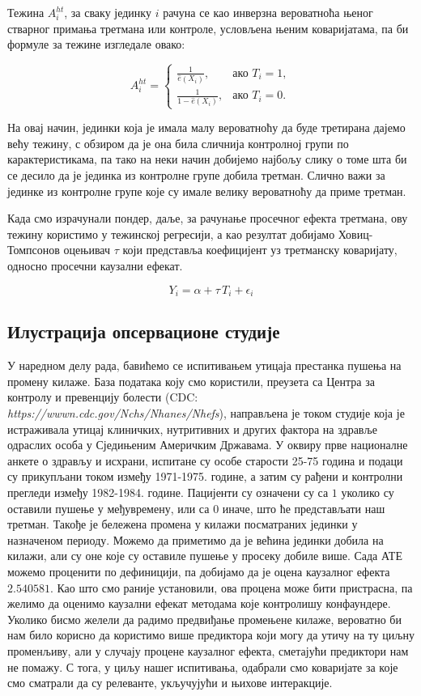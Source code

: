 \documentclass[12pt, a4paper]{article}
\begin{document}
Тежина $A_i^{ht}$, за сваку јединку $i$ рачуна се као инверзна вероватноћа њеног стварног примања третмана или контроле, условљена њеним коваријатама, па би формуле за тежине изгледале овако:

\[
A_i^{ht} =
\begin{cases}
\displaystyle \frac{1}{\hat{e}(X_i)}, & \text{ако } T_i = 1,\\[2mm]
\displaystyle \frac{1}{1 - \hat{e}(X_i)}, & \text{ако } T_i = 0.
\end{cases}
\]


На овај начин, јединки која је имала малу вероватноћу да буде третирана дајемо већу тежину, с обзиром да је она била сличнија контролној групи по карактеристикама, па тако на неки начин добијемо најбољу слику о томе шта би се десило да је јединка из контролне групе добила третман. Слично важи за јединке из контролне групе које су имале велику вероватноћу да приме третман.

Када смо израчунали пондер, даље, за рачунање просечног ефекта третмана, ову тежину користимо у тежинској регресији, а као резултат добијамо Ховиц-Томпсонов  оцењивач $\tau$ који представља коефицијент уз третманску коваријату, односно просечни каузални ефекат.

$$Y_i = \alpha + \tau \, T_i + \epsilon_i$$

\subsection{Илустрација опсервационе студије}
У наредном делу рада, бавићемо се испитивањем утицаја престанка пушења на промену килаже. База података коју смо користили, преузета са Центра за контролу и превенцију болести (CDC: \textit{https://wwwn.cdc.gov/Nchs/Nhanes/Nhefs}), направљена је током студије која је истраживала утицај клиничких, нутритивних и других фактора на здравље одраслих особа у Сједињеним Америчким Државама. У оквиру прве националне анкете о здрављу и исхрани, испитане су особе старости 25-75 година и подаци су прикупљани током  између 1971-1975. године, а затим су рађени и контролни прегледи између 1982-1984. године. Пацијенти су означени су са $1$ уколико су оставили пушење у међувремену, или са $0$ иначе, што ће представљати наш третман. Такође је бележена промена у килажи посматраних јединки у назначеном периоду. Можемо да приметимо да је већина јединки добила на килажи, али су оне које су оставиле пушење у просеку добиле више. Сада АТЕ можемо проценити по дефиницији, па добијамо да је оцена каузалног ефекта $2.540581$. Као што смо раније установили, ова процена може бити пристрасна, па желимо да оценимо каузални ефекат методама које контролишу конфаундере. 
Уколико бисмо желели да радимо предвиђање промењене килаже, вероватно би нам било корисно да користимо више предиктора који могу да утичу на ту циљну променљиву, али у случају процене каузалног ефекта, сметајући предиктори нам не помажу. С тога, у циљу нашег испитивања, одабрали смо коваријате за које смо сматрали да су релеванте, укључујући и њихове интеракције. 
\end{document}
